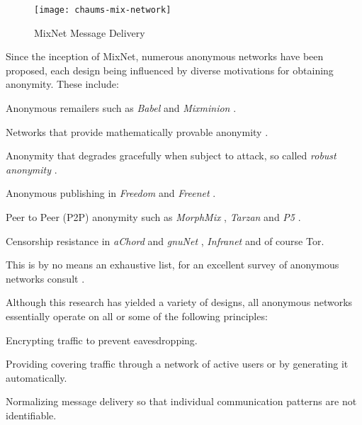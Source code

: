 \documentclass{ecuthesis}
\begin{document}
\begin{figure}[H]
  \centering\texttt{[image: chaums-mix-network]}
  \caption{MixNet Message Delivery}
  \label{chaums-mix-network}
\end{figure}

Since the inception of MixNet, numerous anonymous networks have been proposed,
each design being influenced by diverse motivations for obtaining anonymity.
These include:

\begin{itemize*}
  \item Anonymous remailers such as \emph{Babel} \parencite{Gulcu:1996p1662}
    and \emph{Mixminion} \parencite{Danezis:2003ys}.
  \item Networks that provide mathematically provable anonymity
    \parencite{Chaum:1988p5869,Waidner:1989p5870,Berman:2004p303}.
  \item Anonymity that degrades gracefully when subject to attack, so called
    \emph{robust anonymity} \parencite{Waidner:1989p5870,Jakobsson:1998p5137}.
  \item Anonymous publishing in \emph{Freedom} \parencite{Goldberg:1999p2231}
    and \emph{Freenet} \parencite{Clarke:2001p2435}.
  \item Peer to Peer (P2P) anonymity such as \emph{MorphMix}
    \parencite{Rennhard:2002p4559}, \emph{Tarzan} \parencite{Freedman:2002kx} and
    \emph{P5} \parencite{P5Sherwood:2005p5872}.
  \item Censorship resistance in \emph{aChord} and \emph{gnuNet}
    \parencite{Hazel:2002p6929}, \emph{Infranet} \parencite{Feamster:2002p307}
    and of course Tor.
\end{itemize*}

This is by no means an exhaustive list, for an excellent survey of anonymous
networks consult \textcite{Danezis:2008p346}.

Although this research has yielded a variety of designs, all anonymous
networks essentially operate on all or some of the following principles:

\begin{itemize*}
  \item Encrypting traffic to prevent eavesdropping.
  \item Providing covering traffic through a network of active users or by
    generating it automatically.
  \item Normalizing message delivery so that individual communication patterns
    are not identifiable.
\end{itemize*}
\end{document}
